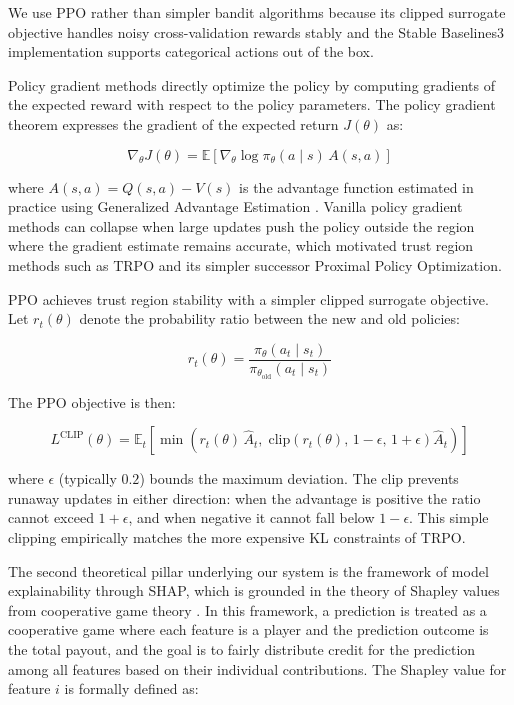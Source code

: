 \documentclass{article}
\begin{document}
We use PPO \citep{schulman2017proximal} rather than simpler bandit algorithms
because its clipped surrogate objective handles noisy cross-validation
rewards stably and the Stable Baselines3 implementation supports categorical
actions out of the box.


Policy gradient methods directly optimize the policy by computing gradients
of the expected reward with respect to the policy parameters. The policy
gradient theorem \citep{sutton1999policy} expresses the gradient of the
expected return $J(\theta)$ as:

\begin{equation}
\nabla_\theta J(\theta) = \mathbb{E}\left[\nabla_\theta \log \pi_\theta(a \mid s) \, A(s, a)\right]
\end{equation}

where $A(s, a) = Q(s, a) - V(s)$ is the advantage function estimated in
practice using Generalized Advantage Estimation \citep{schulman2016gae}.
Vanilla policy gradient methods can collapse when large updates push the
policy outside the region where the gradient estimate remains accurate,
which motivated trust region methods such as TRPO \citep{schulman2015trust}
and its simpler successor Proximal Policy Optimization.

PPO \citep{schulman2017proximal} achieves trust region stability with a
simpler clipped surrogate objective. Let $r_t(\theta)$ denote the
probability ratio between the new and old policies:

\begin{equation}
r_t(\theta) = \frac{\pi_\theta(a_t \mid s_t)}{\pi_{\theta_{\text{old}}}(a_t \mid s_t)}
\end{equation}

The PPO objective is then:

\begin{equation}
L^{\text{CLIP}}(\theta) = \mathbb{E}_t\left[\min\left(r_t(\theta) \, \hat{A}_t, \; \text{clip}\left(r_t(\theta), \, 1 - \epsilon, \, 1 + \epsilon\right) \hat{A}_t\right)\right]
\end{equation}

where $\epsilon$ (typically $0.2$) bounds the maximum deviation. The clip
prevents runaway updates in either direction: when the advantage is
positive the ratio cannot exceed $1 + \epsilon$, and when negative it
cannot fall below $1 - \epsilon$. This simple clipping empirically matches
the more expensive KL constraints of TRPO.

The second theoretical pillar underlying our system is the framework of model 
explainability through SHAP, which is grounded in the theory of Shapley values 
from cooperative game theory \citep{shapley1953value}. In this framework, a 
prediction is treated as a cooperative game where each feature is a player and 
the prediction outcome is the total payout, and the goal is to fairly distribute 
credit for the prediction among all features based on their individual 
contributions. The Shapley value for feature $i$ is formally defined as:
\end{document}
